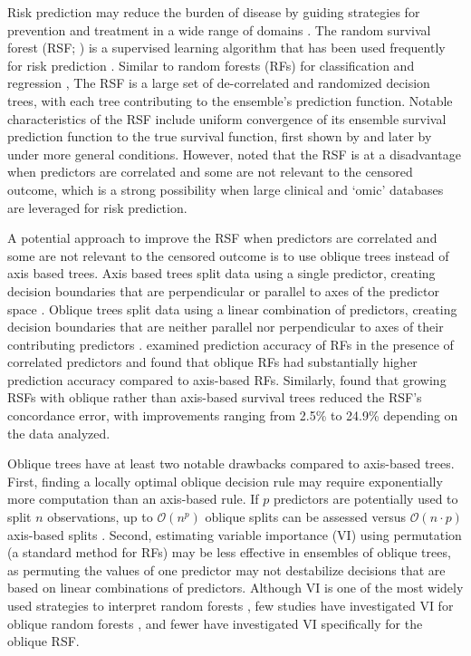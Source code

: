 \documentclass{article}\usepackage[]{graphicx}\usepackage[]{xcolor}
\begin{document}
Risk prediction may reduce the burden of disease by guiding strategies for prevention and treatment in a wide range of domains \citep{moons2012riskII, moons2012riskI}. The random survival forest (RSF; \citet{ishwaran2008random, hothorn2006unbiased}) is a supervised learning algorithm that has been used frequently for risk prediction \citep{wang2017selective}. Similar to random forests (RFs) for classification and regression \citep{breiman2001random}, The RSF is a large set of de-correlated and randomized decision trees, with each tree contributing to the ensemble's prediction function. Notable characteristics of the RSF include uniform convergence of its ensemble survival prediction function to the true survival function, first shown by \citet{ishwaran2010consistency} and later by \citet{cui2017consistency} under more general conditions. However, \citet{cui2017consistency} noted that the RSF is at a disadvantage when predictors are correlated and some are not relevant to the censored outcome, which is a strong possibility when large clinical and `omic' databases are leveraged for risk prediction.

A potential approach to improve the RSF when predictors are correlated and some are not relevant to the censored outcome is to use oblique trees instead of axis based trees. Axis based trees split data using a single predictor, creating decision boundaries that are perpendicular or parallel to axes of the predictor space \citep[see][Chapter~2]{breiman2017classification}. Oblique trees split data using a linear combination of predictors, creating decision boundaries that are neither parallel nor perpendicular to axes of their contributing predictors \citep[see][Chapter~5]{breiman2017classification}. \citet{menze2011oblique} examined prediction accuracy of RFs in the presence of correlated predictors and found that oblique RFs had substantially higher prediction accuracy compared to axis-based RFs. Similarly, \citet{jaeger2019oblique} found that growing RSFs with oblique rather than axis-based survival trees reduced the RSF's concordance error, with improvements ranging from 2.5\% to 24.9\% depending on the data analyzed.

Oblique trees have at least two notable drawbacks compared to axis-based trees. First, finding a locally optimal oblique decision rule may require exponentially more computation than an axis-based rule. If $p$ predictors are potentially used to split $n$ observations, up to $\mathcal{O}(n^p)$ oblique splits can be assessed versus $\mathcal{O}(n \cdot p)$ axis-based splits \citep{heath1993induction, murthy1994system}. Second, estimating variable importance (VI) using permutation (a standard method for RFs) may be less effective in ensembles of oblique trees, as permuting the values of one predictor may not destabilize decisions that are based on linear combinations of predictors. Although VI is one of the most widely used strategies to interpret random forests \citep{ishwaran2019standard}, few studies have investigated VI for oblique random forests \citep[see][Section~5]{menze2011oblique}, and fewer have investigated VI specifically for the oblique RSF.
\end{document}
